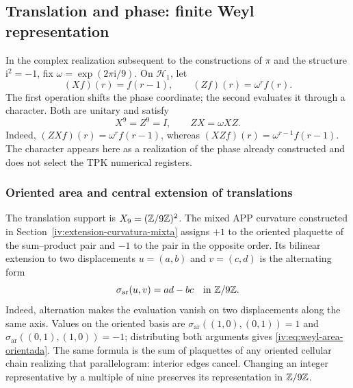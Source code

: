 \subsection{Translation and phase: finite Weyl representation}

In the complex realization subsequent to the constructions of
\(\pi\) and the structure \(\mathrm i^2=-1\), fix
\(\omega=\exp(2\pi\mathrm i/9)\). On \(\mathcal H_1\), let
\begin{equation}
 (Xf)(r)=f(r-1),\qquad (Zf)(r)=\omega^r f(r).
 \label{iv:eq:weyl-operadores}
\end{equation}
The first operation shifts the phase coordinate; the second
evaluates it through a character. Both are unitary and satisfy
\begin{equation}
 X^9=Z^9=I,\qquad ZX=\omega XZ.
 \label{iv:eq:weyl-relacion}
\end{equation}
Indeed, \((ZXf)(r)=\omega^r f(r-1)\), whereas
\((XZf)(r)=\omega^{r-1}f(r-1)\). The character appears here as a
realization of the phase already constructed and does not select the TPK
numerical registers.

\subsubsection{Oriented area and central extension of translations}
\label{iv:weyl-area-extension}

The translation support is \(X_9=(\mathbb Z/9\mathbb Z)^2\).
The mixed APP curvature constructed in
Section~\ref{iv:extension-curvatura-mixta} assigns \(+1\) to the
oriented plaquette of the sum--product pair and \(-1\) to the
pair in the opposite order. Its bilinear extension to two displacements
\(u=(a,b)\) and \(v=(c,d)\) is the alternating form
\begin{equation}
 \sigma_{\mathrm{ar}}(u,v)=ad-bc\quad\text{in }\mathbb Z/9\mathbb Z.
 \label{iv:eq:weyl-area-orientada}
\end{equation}
Indeed, alternation makes the evaluation vanish on two displacements
along the same axis. Values on the oriented basis are
\(\sigma_{\mathrm{ar}}((1,0),(0,1))=1\) and
\(\sigma_{\mathrm{ar}}((0,1),(1,0))=-1\); distributing both
arguments gives \eqref{iv:eq:weyl-area-orientada}. The same formula is
the sum of plaquettes of any oriented cellular chain realizing
that parallelogram: interior edges cancel. Changing an
integer representative by a multiple of nine preserves its representation
in \(\mathbb Z/9\mathbb Z\).

